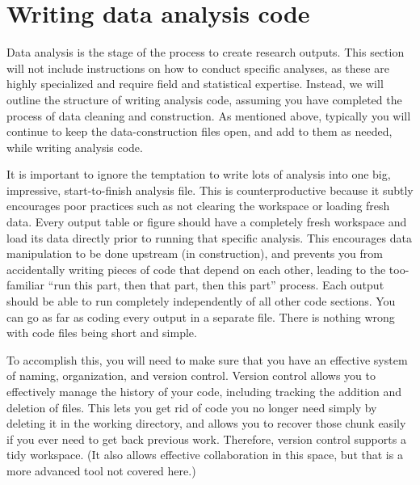 
\section{Writing data analysis code}

Data analysis is the stage of the process to create research outputs.
This section will not include instructions on how to conduct specific analyses,
as these are highly specialized and require field and statistical expertise.
Instead, we will outline the structure of writing analysis code,
assuming you have completed the process of data cleaning and construction.
As mentioned above, typically you will continue to keep
the data-construction files open, and add to them as needed,
while writing analysis code.

It is important to ignore the temptation to write lots of analysis
into one big, impressive, start-to-finish analysis file.
This is counterproductive because it subtly encourages poor practices
such as not clearing the workspace or loading fresh data.
Every output table or figure should have
a completely fresh workspace and load its data directly
prior to running that specific analysis.
This encourages data manipulation to be done upstream (in construction),
and prevents you from accidentally writing pieces of code
that depend on each other, leading to the too-familiar
``run this part, then that part, then this part'' process.
Each output should be able to run completely independently
of all other code sections.
You can go as far as coding every output in a separate file.
There is nothing wrong with code files being short and simple.

To accomplish this, you will need to make sure that you
have an effective system of naming, organization, and version control.
Version control allows you to effectively manage the history of your code,
including tracking the addition and deletion of files.
This lets you get rid of code you no longer need
simply by deleting it in the working directory,
and allows you to recover those chunk easily
if you ever need to get back previous work.
Therefore, version control supports a tidy workspace.
(It also allows effective collaboration in this space,
but that is a more advanced tool not covered here.)

